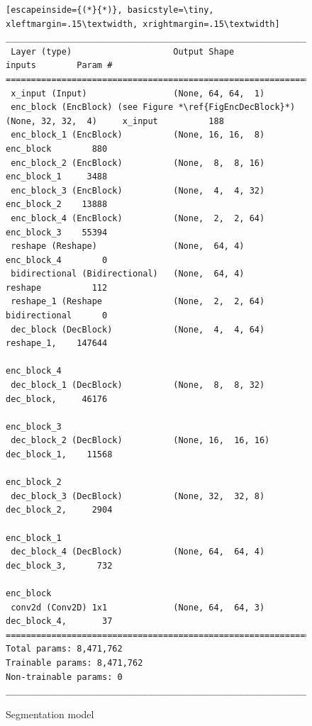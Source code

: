 \begin{figure}[htbp]
\begin{lstlisting}[escapeinside={(*}{*)}, basicstyle=\tiny, xleftmargin=.15\textwidth, xrightmargin=.15\textwidth]
____________________________________________________________________________
 Layer (type)                    Output Shape          inputs        Param #
============================================================================
 x_input (Input)                 (None, 64, 64,  1)                     
 enc_block (EncBlock) (see Figure *\ref{FigEncDecBlock}*)        (None, 32, 32,  4)     x_input          188
 enc_block_1 (EncBlock)          (None, 16, 16,  8)     enc_block        880
 enc_block_2 (EncBlock)          (None,  8,  8, 16)     enc_block_1     3488
 enc_block_3 (EncBlock)          (None,  4,  4, 32)     enc_block_2    13888
 enc_block_4 (EncBlock)          (None,  2,  2, 64)     enc_block_3    55394
 reshape (Reshape)               (None,  64, 4)         enc_block_4        0
 bidirectional (Bidirectional)   (None,  64, 4)         reshape          112
 reshape_1 (Reshape              (None,  2,  2, 64)     bidirectional      0
 dec_block (DecBlock)            (None,  4,  4, 64)     reshape_1,    147644
                                                        enc_block_4
 dec_block_1 (DecBlock)          (None,  8,  8, 32)     dec_block,     46176
                                                        enc_block_3
 dec_block_2 (DecBlock)          (None, 16,  16, 16)    dec_block_1,    11568
                                                        enc_block_2
 dec_block_3 (DecBlock)          (None, 32,  32, 8)     dec_block_2,     2904
                                                        enc_block_1
 dec_block_4 (DecBlock)          (None, 64,  64, 4)     dec_block_3,      732
                                                        enc_block
 conv2d (Conv2D) 1x1             (None, 64,  64, 3)     dec_block_4,       37
=============================================================================
Total params: 8,471,762
Trainable params: 8,471,762
Non-trainable params: 0
_____________________________________________________________________________
\end{lstlisting}
\caption{Segmentation model}
\label{FigSegModelSumm}
\end{figure}

